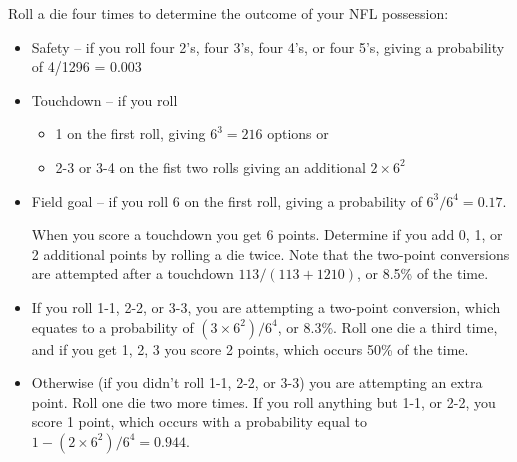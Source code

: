 
Roll a die four times to determine the outcome of your NFL possession:

\begin{itemize}
	\item Safety -- if you roll four 2's, four 3's, four 4's, or four 5's, giving a probability of 4/1296 = 0.003
	\item Touchdown -- if you roll
	\begin{itemize}
		\item 1 on the first roll, giving \(6^3=216\) options or 
		\item 2-3 or 3-4 on the fist two rolls giving an additional \(2\times 6^2\) 
	\end{itemize}
	\item Field goal -- if you roll 6 on the first roll, giving a probability of \(6^3/6^4 = 0.17\).
	
	\hline
	When you score a touchdown you get 6 points. Determine if you add 0, 1, or 2 additional points by rolling a die twice. Note that the two-point conversions are attempted after a touchdown \(113/(113+1210)\), or 8.5\% of the time.
	\item If you roll 1-1, 2-2, or 3-3, you are attempting a two-point conversion, which equates to a probability of \((3\times6^2)/6^4\), or 8.3\%. Roll one die a third time, and if you get  1, 2, 3 you score 2 points, which occurs 50\% of the time.
	\item Otherwise (if you didn't roll 1-1, 2-2, or 3-3) you are attempting an extra point. Roll one die two more times. If you roll anything but 1-1, or 2-2, you score 1 point, which occurs with a probability equal to \(1-(2\times 6^2)/6^4 = 0.944\).
\end{itemize}